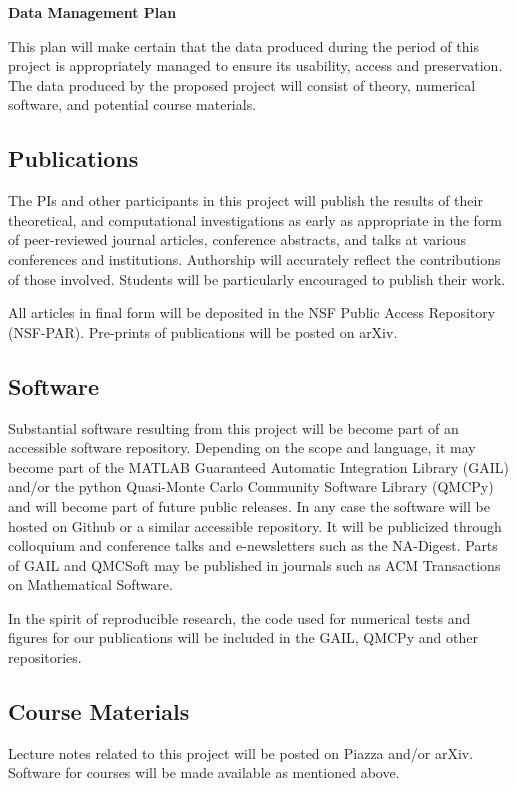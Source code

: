 \documentclass[11pt]{NSFamsart}
\begin{document}

\centerline{\textbf{\Large Data Management Plan}}

\bigskip



This plan will make certain that the data produced during the period of this project is appropriately managed to ensure its usability, access and preservation.  The data produced by the proposed project will consist of theory, numerical software, and potential course materials. 

\subsection*{Publications} The PIs and other participants in this project will publish the results of their theoretical, and 
computational investigations as early as appropriate in the form of peer-reviewed journal articles, 
conference abstracts, and talks at various conferences and institutions. Authorship will accurately 
reflect the contributions of those involved.  Students will be particularly encouraged to publish their 
work. 

All articles in final form will be deposited in the NSF Public Access Repository (NSF-PAR).  Pre-prints of publications will be posted on arXiv.

\subsection*{Software} Substantial software resulting from this project will be become part of an accessible software repository.  Depending on the scope and language, it may become part of the MATLAB  Guaranteed Automatic 
Integration Library (GAIL) and/or the python Quasi-Monte Carlo Community Software Library (QMCPy) and will become part of future public releases.  In any case the software will be hosted on 
Github or a similar accessible repository.  It will be publicized through colloquium and 
conference talks and e-newsletters such as the NA-Digest.  Parts of GAIL and QMCSoft may be published in journals such as ACM Transactions on Mathematical Software.

In the spirit of reproducible research, the code used for numerical tests and figures for our 
publications will be included in the GAIL, QMCPy and other repositories.

\subsection*{Course Materials} Lecture notes related to this project will be posted on Piazza and/or arXiv.  Software for courses will be made available as mentioned above.
\end{document}

